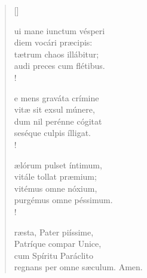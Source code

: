 \vspace{0.3cm}
\begin{verse}[\versewidth]
 

ui mane iunctum vésperi\\
diem vocári præcipis:\\
tætrum chaos illábitur;\\
audi preces cum flétibus.\\!

e mens graváta crímine\\
vitæ sit exsul múnere,\\ 
dum nil perénne cógitat\\
seséque culpis ílligat.\\!

ælórum pulset íntimum,\\
vitále tollat præmium;\\
vitémus omne nóxium,\\ 
purgémus omne péssimum.\\!

ræsta, Pater piíssime,\\ 
Patríque compar Unice,\\ 
cum Spíritu Paráclito\\
regnans per omne sæculum. Amen.


\end{verse}

\vspace{0.3cm}


\vspace{0.6cm}





